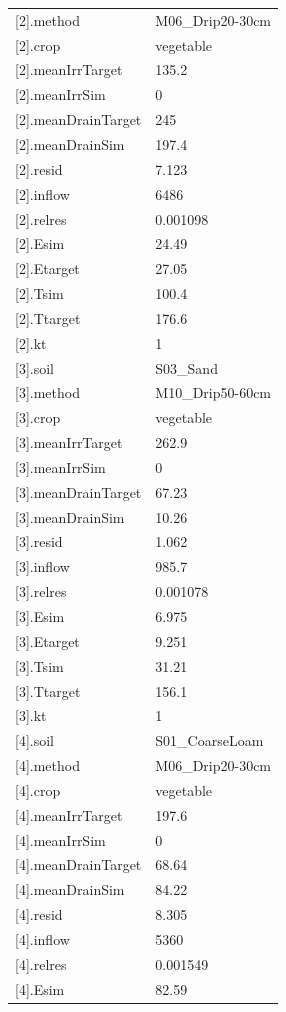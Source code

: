 {\begin{longtable}{p{}p{}}
{}[2].method & M06\_Drip20-30cm\\
{}[2].crop & vegetable\\
{}[2].meanIrrTarget & 135.2\\
{}[2].meanIrrSim & 0\\
{}[2].meanDrainTarget & 245\\
{}[2].meanDrainSim & 197.4\\
{}[2].resid & 7.123\\
{}[2].inflow & 6486\\
{}[2].relres & 0.001098\\
{}[2].Esim & 24.49\\
{}[2].Etarget & 27.05\\
{}[2].Tsim & 100.4\\
{}[2].Ttarget & 176.6\\
{}[2].kt & 1\\
{}[3].soil & S03\_Sand\\
{}[3].method & M10\_Drip50-60cm\\
{}[3].crop & vegetable\\
{}[3].meanIrrTarget & 262.9\\
{}[3].meanIrrSim & 0\\
{}[3].meanDrainTarget & 67.23\\
{}[3].meanDrainSim & 10.26\\
{}[3].resid & 1.062\\
{}[3].inflow & 985.7\\
{}[3].relres & 0.001078\\
{}[3].Esim & 6.975\\
{}[3].Etarget & 9.251\\
{}[3].Tsim & 31.21\\
{}[3].Ttarget & 156.1\\
{}[3].kt & 1\\
{}[4].soil & S01\_CoarseLoam\\
{}[4].method & M06\_Drip20-30cm\\
{}[4].crop & vegetable\\
{}[4].meanIrrTarget & 197.6\\
{}[4].meanIrrSim & 0\\
{}[4].meanDrainTarget & 68.64\\
{}[4].meanDrainSim & 84.22\\
{}[4].resid & 8.305\\
{}[4].inflow & 5360\\
{}[4].relres & 0.001549\\
{}[4].Esim & 82.59\\

\end{longtable}}
